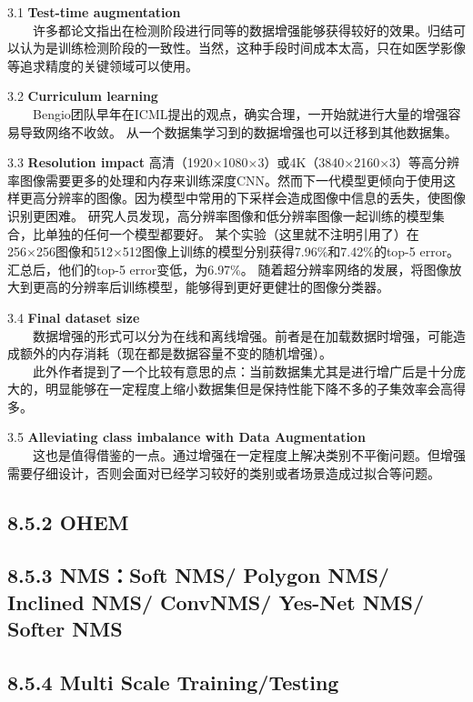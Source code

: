 3.1 \textbf{Test-time augmentation}\\
  许多都论文指出在检测阶段进行同等的数据增强能够获得较好的效果。归结可以认为是训练检测阶段的一致性。当然，这种手段时间成本太高，只在如医学影像等追求精度的关键领域可以使用。

3.2 \textbf{Curriculum learning}\\
  Bengio团队早年在ICML提出的观点，确实合理，一开始就进行大量的增强容易导致网络不收敛。
从一个数据集学习到的数据增强也可以迁移到其他数据集。

3.3 \textbf{Resolution impact}
高清（1920×1080×3）或4K（3840×2160×3）等高分辨率图像需要更多的处理和内存来训练深度CNN。然而下一代模型更倾向于使用这样更高分辨率的图像。因为模型中常用的下采样会造成图像中信息的丢失，使图像识别更困难。
研究人员发现，高分辨率图像和低分辨率图像一起训练的模型集合，比单独的任何一个模型都要好。
某个实验（这里就不注明引用了）在256×256图像和512×512图像上训练的模型分别获得7.96\%和7.42\%的top-5
error。汇总后，他们的top-5 error变低，为6.97\%。
随着超分辨率网络的发展，将图像放大到更高的分辨率后训练模型，能够得到更好更健壮的图像分类器。

3.4 \textbf{Final dataset size}\\
  数据增强的形式可以分为在线和离线增强。前者是在加载数据时增强，可能造成额外的内存消耗（现在都是数据容量不变的随机增强）。\\
  此外作者提到了一个比较有意思的点：当前数据集尤其是进行增广后是十分庞大的，明显能够在一定程度上缩小数据集但是保持性能下降不多的子集效率会高得多。

3.5 \textbf{Alleviating class imbalance with Data Augmentation}\\
  这也是值得借鉴的一点。通过增强在一定程度上解决类别不平衡问题。但增强需要仔细设计，否则会面对已经学习较好的类别或者场景造成过拟合等问题。

\subsection{8.5.2 OHEM}\label{ohem}

\subsection{8.5.3 NMS：Soft NMS/ Polygon NMS/ Inclined NMS/ ConvNMS/
Yes-Net NMS/ Softer
NMS}\label{nmssoft-nms-polygon-nms-inclined-nms-convnms-yes-net-nms-softer-nms}

\subsection{8.5.4 Multi Scale
Training/Testing}\label{multi-scale-trainingtesting}

